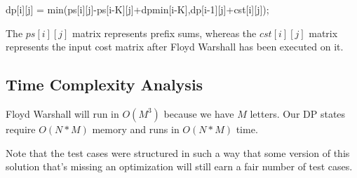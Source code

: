 \documentclass{article}
\begin{document}
 dp[i][j] = min(ps[i][j]-ps[i-K][j]+dpmin[i-K],dp[i-1][j]+cst[i][j]);
 
 The $ps[i][j]$ matrix represents prefix sums, whereas the $cst[i][j]$ matrix represents the input cost matrix after Floyd Warshall has been executed on it.
 
\subsection{Time Complexity Analysis}
Floyd Warshall will run in $O(M^3)$ because we have $M$ letters. Our DP states require $O(N*M)$ memory and runs in $O(N*M)$ time.

Note that the test cases were structured in such a way that some version of this solution that's missing an optimization will still earn a fair number of test cases.
\end{document}
